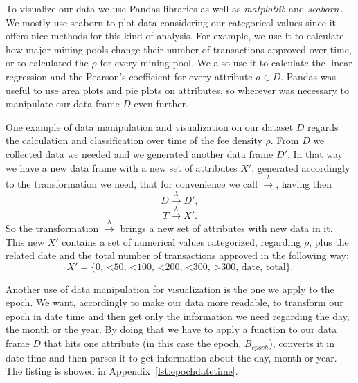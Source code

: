 \documentclass[USenglish]{uit-thesis}
\begin{document}
To visualize our data we use Pandas libraries
as well as \emph{matplotlib} and
\emph{seaborn}\,\cite{pandas, matplotlib, michael_waskom_seaborn}.
We mostly use seaborn to plot data considering our
categorical values since it offers nice methods for
this kind of analysis. For example, we use it to
calculate how major mining pools change their
number of transactions approved over time, or to
calculated the $\rho$ for every mining pool. We also
use it to calculate the linear regression and the Pearson's
coefficient for every attribute $a \in D$.
Pandas was useful to use area plots and pie plots
on attributes, so wherever was necessary to manipulate
our data frame $D$ even further.

One example of data manipulation and visualization on our
dataset $D$ regards the calculation and classification
over time of the fee density $\rho$. From $D$ we collected
data we needed and we generated another data frame $D'$.
In that way we have a new data frame with a new set of attributes
$X'$, generated accordingly to the transformation
we need, that for convenience
we call $\xrightarrow{\text{$\lambda$}}$, having then
\[
D \xrightarrow{\text{$\lambda$}} D',
\]
\[
T \xrightarrow{\text{$\lambda$}} X'.
\]
So the transformation $\xrightarrow{\text{$\lambda$}}$ brings a new set
of attributes with new data in it.
This new $X'$ contains a set of numerical values categorized, 
regarding $\rho$,
plus the related date and the total number of transactions approved in
the following way:
\[
X' = \{\text{0, <50, <100, <200, <300, >300, date, total} \}.
\]

Another use of data manipulation for visualization is the one we apply to
the epoch. We want, accordingly to make our data more readable, to transform
our epoch in date time and then get only the information we need
regarding the day, the month or the year. By doing that we have to
apply a function to our data frame $D$ that hits one attribute
(in this case the epoch, $B_{epoch}$), converts it in date time
and then parses it to get information about the day, month or year.
The listing is showed in Appendix~\ref{lst:epochdatetime}.
\end{document}
